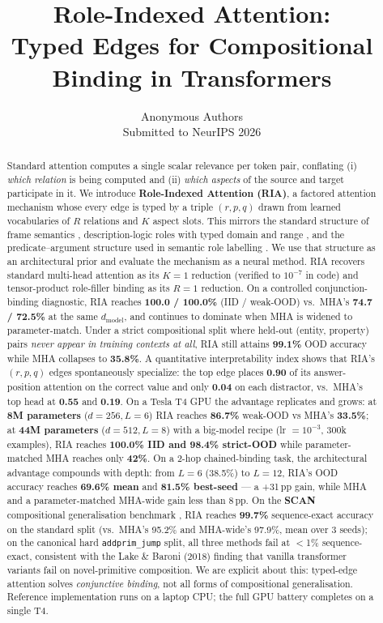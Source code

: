 \documentclass{article}
\title{Role-Indexed Attention:\\
Typed Edges for Compositional Binding in Transformers}
\author{%
  Anonymous Authors \\
  Submitted to NeurIPS 2026
}
\date{}
\begin{document}
\maketitle

\begin{abstract}
Standard attention computes a single scalar relevance per token pair,
conflating (i) \emph{which relation} is being computed and (ii)
\emph{which aspects} of the source and target participate in it. We
introduce \textbf{Role-Indexed Attention (RIA)}, a factored attention
mechanism whose every edge is typed by a triple $(r, p, q)$ drawn
from learned vocabularies of $R$ relations and $K$ aspect slots. This
mirrors the standard structure of frame semantics
\citep{fillmore1976,baker1998framenet}, description-logic roles with
typed domain and range \citep{baader2003description}, and the
predicate--argument structure used in semantic role labelling
\citep{palmer2005propbank}. We use that structure as an architectural
prior and evaluate the mechanism as a neural method.
%
RIA recovers standard multi-head attention as its $K{=}1$ reduction
(verified to $10^{-7}$ in code) and tensor-product role-filler binding
as its $R{=}1$ reduction. On a controlled conjunction-binding
diagnostic, RIA reaches \textbf{100.0 / 100.0\%} (IID / weak-OOD)
vs.\ MHA's \textbf{74.7 / 72.5\%} at the same $d_{\text{model}}$, and
continues to dominate when MHA is widened to parameter-match.  Under a
strict compositional split where held-out (entity, property) pairs
\emph{never appear in training contexts at all}, RIA still attains
\textbf{99.1\%} OOD accuracy while MHA collapses to
\textbf{35.8\%}. A quantitative interpretability index
shows that RIA's $(r, p, q)$ edges spontaneously specialize: the top
edge places \textbf{0.90} of its answer-position attention on the
correct value and only \textbf{0.04} on each distractor, vs.\ MHA's
top head at \textbf{0.55} and \textbf{0.19}. On a Tesla T4 GPU the
advantage replicates and grows: at \textbf{8M parameters}
($d{=}256, L{=}6$) RIA reaches \textbf{86.7\%} weak-OOD vs MHA's
\textbf{33.5\%}; at \textbf{44M parameters} ($d{=}512, L{=}8$) with a
big-model recipe (lr $= 10^{-3}$, 300k examples), RIA reaches
\textbf{100.0\% IID and 98.4\% strict-OOD} while parameter-matched MHA
reaches only \textbf{42\%}. On a 2-hop chained-binding task,
the architectural advantage compounds with depth: from $L{=}6$
(38.5\%) to $L{=}12$, RIA's OOD accuracy reaches \textbf{69.6\% mean}
and \textbf{81.5\% best-seed} --- a +31\,pp gain, while MHA and a
parameter-matched MHA-wide gain less than 8\,pp. On the
\textbf{SCAN} compositional generalisation benchmark
\citep{lake2018scan}, RIA reaches \textbf{99.7\%} sequence-exact
accuracy on the standard split (vs.\ MHA's 95.2\% and MHA-wide's
97.9\%, mean over 3 seeds); on the canonical hard \texttt{addprim\_jump}
split, all three methods fail at $<$1\% sequence-exact, consistent
with the Lake \& Baroni (2018) finding that vanilla transformer
variants fail on novel-primitive composition. We are explicit about
this: typed-edge attention solves \emph{conjunctive binding}, not
all forms of compositional generalisation. Reference implementation
runs on a laptop CPU; the full GPU battery completes on a single T4.
\end{abstract}
\end{document}
